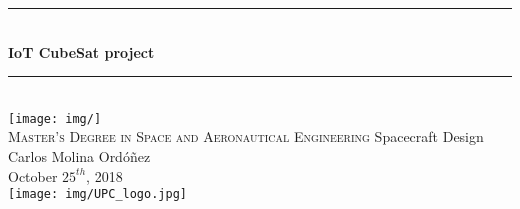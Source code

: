 
\begin{titlepage}

\newcommand{\HRule}{\rule{\linewidth}{0.5mm}} %

\center %


\HRule \\[0.2cm]
{ \Large \bfseries
IoT CubeSat project\\
}
\HRule \\[1.5cm]

\texttt{[image: img/]}\\[1.4cm]

\textsc{\large Master's Degree in Space and Aeronautical Engineering}
\large Spacecraft Design\\[0.8cm]

{ \normalsize Carlos Molina Ordóñez}\\

{\normalsize October $25^{th}$, 2018}\\[2cm] %

\texttt{[image: img/UPC\_logo.jpg]}\\[0.4cm]


\vfill %

\end{titlepage}

